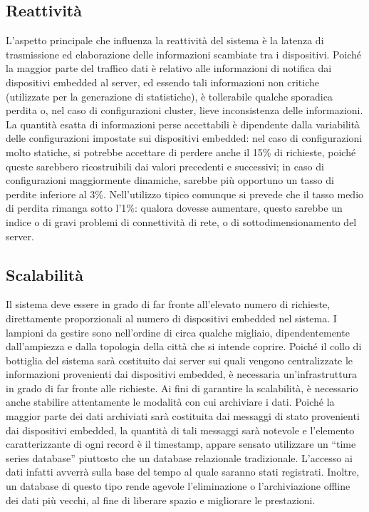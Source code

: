 \subsection{Reattività}
L'aspetto principale che influenza la reattività del sistema è la latenza di trasmissione ed elaborazione delle informazioni scambiate tra i dispositivi.
Poiché la maggior parte del traffico dati è relativo alle informazioni di notifica dai dispositivi embedded al server, ed essendo tali informazioni non critiche (utilizzate per la generazione di statistiche), è tollerabile qualche sporadica perdita o, nel caso di configurazioni cluster, lieve inconsistenza delle informazioni. La quantità esatta di informazioni perse accettabili è dipendente dalla variabilità delle configurazioni impostate sui dispositivi embedded: nel caso di configurazioni molto statiche, si potrebbe accettare di perdere anche il 15\% di richieste, poiché queste sarebbero ricostruibili dai valori precedenti e successivi; in caso di configurazioni maggiormente dinamiche, sarebbe più opportuno un tasso di perdite inferiore al 3\%. Nell’utilizzo tipico comunque si prevede che il tasso medio di perdita rimanga sotto l’1\%: qualora dovesse aumentare, questo sarebbe un indice o di gravi problemi di connettività di rete, o di sottodimensionamento del server.
\subsection{Scalabilità}
Il sistema deve essere in grado di far fronte all'elevato numero di richieste, direttamente proporzionali al numero di dispositivi embedded nel sistema. I lampioni da gestire sono nell'ordine di circa qualche migliaio, dipendentemente dall'ampiezza e dalla topologia della città che si intende coprire. Poiché il collo di bottiglia del sistema sarà costituito dai server sui quali vengono centralizzate le informazioni provenienti dai dispositivi embedded, è necessaria un'infrastruttura in grado di far fronte alle richieste.
Ai fini di garantire la scalabilità, è necessario anche stabilire attentamente le modalità con cui archiviare i dati. Poiché la maggior parte dei dati archiviati sarà costituita dai messaggi di stato provenienti dai dispositivi embedded, la quantità di tali messaggi sarà notevole e l'elemento caratterizzante di ogni record è il timestamp, appare sensato utilizzare un ``time series database'' piuttosto che un database relazionale tradizionale. L'accesso ai dati infatti avverrà sulla base del tempo al quale saranno stati registrati. Inoltre, un database di questo tipo rende agevole l'eliminazione o l'archiviazione offline dei dati più vecchi, al fine di liberare spazio e migliorare le prestazioni.
